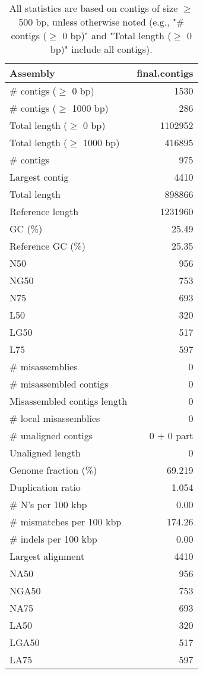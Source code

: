 \documentclass[12pt,a4paper]{article}
\begin{document}
\begin{table}[ht]
\begin{center}
\caption{All statistics are based on contigs of size $\geq$ 500 bp, unless otherwise noted (e.g., "\# contigs ($\geq$ 0 bp)" and "Total length ($\geq$ 0 bp)" include all contigs).}
\begin{tabular}{|l*{1}{|r}|}
\hline
Assembly & final.contigs \\ \hline
\# contigs ($\geq$ 0 bp) & 1530 \\ \hline
\# contigs ($\geq$ 1000 bp) & 286 \\ \hline
Total length ($\geq$ 0 bp) & 1102952 \\ \hline
Total length ($\geq$ 1000 bp) & 416895 \\ \hline
\# contigs & 975 \\ \hline
Largest contig & 4410 \\ \hline
Total length & 898866 \\ \hline
Reference length & 1231960 \\ \hline
GC (\%) & 25.49 \\ \hline
Reference GC (\%) & 25.35 \\ \hline
N50 & 956 \\ \hline
NG50 & 753 \\ \hline
N75 & 693 \\ \hline
L50 & 320 \\ \hline
LG50 & 517 \\ \hline
L75 & 597 \\ \hline
\# misassemblies & 0 \\ \hline
\# misassembled contigs & 0 \\ \hline
Misassembled contigs length & 0 \\ \hline
\# local misassemblies & 0 \\ \hline
\# unaligned contigs & 0 + 0 part \\ \hline
Unaligned length & 0 \\ \hline
Genome fraction (\%) & 69.219 \\ \hline
Duplication ratio & 1.054 \\ \hline
\# N's per 100 kbp & 0.00 \\ \hline
\# mismatches per 100 kbp & 174.26 \\ \hline
\# indels per 100 kbp & 0.00 \\ \hline
Largest alignment & 4410 \\ \hline
NA50 & 956 \\ \hline
NGA50 & 753 \\ \hline
NA75 & 693 \\ \hline
LA50 & 320 \\ \hline
LGA50 & 517 \\ \hline
LA75 & 597 \\ \hline
\end{tabular}
\end{center}
\end{table}
\end{document}
